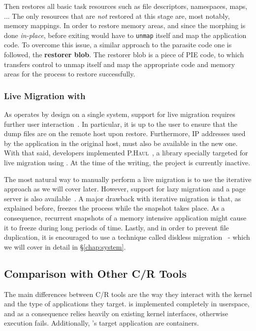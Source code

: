 Then \criu restores all basic task resources such as file descriptors, namespaces, maps, ...
The only resources that are \emph{not} restored at this stage are, most notably, memory mappings.
In order to restore memory areas, and since the morphing is done \textit{in-place}, before exiting \criu would have to \texttt{unmap} itself and map the application code.
To overcome this issue, a similar approach to the parasite code one is followed, the \textbf{restorer blob}.
The restorer blob is a piece of PIE code, to which \criu transfers control to unmap itself and map the appropriate code and memory areas for the process to restore successfully.

\subsubsection*{Live Migration with \criu}

As \criu operates by design on a single system, support for live migration requires further user interaction~\cite{criu-live-migration}.
In particular, it is up to the user to ensure that the dump files are on the remote host upon restore.
Furthermore, IP addresses used by the application in the original host, must also be available in the new one.
With that said, \criu developers implemented \textsc{P.Haul}~\cite{criu-phaul}, a library specially targeted for live migration using \criu.
At the time of the writing, the project is currently inactive.

The most natural way to manually perform a live migration is to use the iterative approach as we will cover later.
However, support for lazy migration and a page server is also available~\cite{criu-lazy-migration}.
A major drawback with iterative migration is that, as explained before, \criu freezes the process while the snapshot takes place.
As a consequence, recurrent snapshots of a memory intensive application might cause it to freeze during long periods of time.
Lastly, and in order to prevent file duplication, it is encouraged to use a technique called diskless migration~\cite{criu-diskless} - which we will cover in detail in \S\ref{chap:system}.

\subsection{Comparison with Other C/R Tools}

The main differences between C/R tools are the way they interact with the kernel and the type of applications they target.
\criu is implemented completely in userspace, and as a consequence relies heavily on existing kernel interfaces, otherwise execution fails.
Additionally, \criu's target application are containers.

